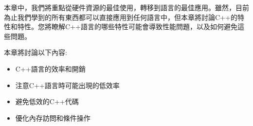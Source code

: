 本章中，我們將重點從硬件資源的最佳使用，轉移到語言的最佳應用。雖然，目前為止我們學到的所有東西都可以直接應用到任何語言中，但本章將討論C++的特性和特性。您將瞭解C++語言的哪些特性可能會導致性能問題，以及如何避免這些問題。 

本章將討論以下內容:

\begin{itemize}
\item
C++語言的效率和開銷

\item
注意C++語言時可能出現的低效率

\item
避免低效的C++代碼

\item
優化內存訪問和條件操作
	
\end{itemize}
